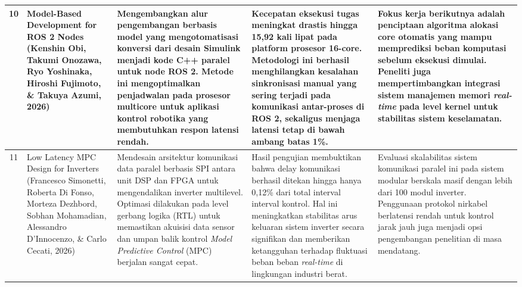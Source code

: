 \documentclass[12pt,a4paper]{article}
\begin{document}
\begin{small}
\begin{longtable}{|c|>{\raggedright\arraybackslash}p{3cm}|>{\raggedright\arraybackslash}p{4cm}|>{\raggedright\arraybackslash}p{4cm}|>{\raggedright\arraybackslash}p{4cm}|}
10 & Model-Based Development for ROS 2 Nodes (Kenshin Obi, Takumi Onozawa, Ryo Yoshinaka, Hiroshi Fujimoto, \& Takuya Azumi, 2026) & Mengembangkan alur pengembangan berbasis model yang mengotomatisasi konversi dari desain Simulink menjadi kode C++ paralel untuk node ROS 2. Metode ini mengoptimalkan penjadwalan pada prosesor multicore untuk aplikasi kontrol robotika yang membutuhkan respon latensi rendah. & Kecepatan eksekusi tugas meningkat drastis hingga 15,92 kali lipat pada platform prosesor 16-core. Metodologi ini berhasil menghilangkan kesalahan sinkronisasi manual yang sering terjadi pada komunikasi antar-proses di ROS 2, sekaligus menjaga latensi tetap di bawah ambang batas 1\%. & Fokus kerja berikutnya adalah penciptaan algoritma alokasi core otomatis yang mampu memprediksi beban komputasi sebelum eksekusi dimulai. Peneliti juga mempertimbangkan integrasi sistem manajemen memori \textit{real-time} pada level kernel untuk stabilitas sistem keselamatan. \\ \hline

11 & Low Latency MPC Design for Inverters (Francesco Simonetti, Roberta Di Fonso, Morteza Dezhbord, Sobhan Mohamadian, Alessandro D’Innocenzo, \& Carlo Cecati, 2026) & Mendesain arsitektur komunikasi data paralel berbasis SPI antara unit DSP dan FPGA untuk mengendalikan inverter multilevel. Optimasi dilakukan pada level gerbang logika (RTL) untuk memastikan akuisisi data sensor dan umpan balik kontrol \textit{Model Predictive Control} (MPC) berjalan sangat cepat. & Hasil pengujian membuktikan bahwa delay komunikasi berhasil ditekan hingga hanya 0,12\% dari total interval interval kontrol. Hal ini meningkatkan stabilitas arus keluaran sistem inverter secara signifikan dan memberikan ketangguhan terhadap fluktuasi beban beban \textit{real-time} di lingkungan industri berat. & Evaluasi skalabilitas sistem komunikasi paralel ini pada sistem modular berskala masif dengan lebih dari 100 modul inverter. Penggunaan protokol nirkabel berlatensi rendah untuk kontrol jarak jauh juga menjadi opsi pengembangan penelitian di masa mendatang. \\ \hline


\end{longtable}
\end{small}
\end{document}
